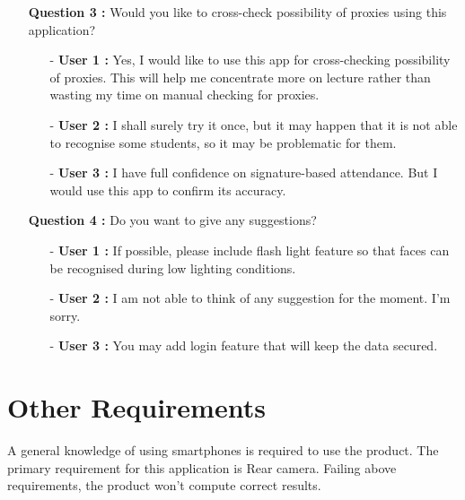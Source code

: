 \documentclass{scrreprt}
\begin{document}
\begin{enumerate}
\begin{enumerate}
\begin{enumerate}
\end{enumerate}
\item[] \textbf{Question 3 :} Would you like to cross-check possibility of proxies using this application? 
\begin{enumerate}
\item[-] \textbf{User 1 :} Yes, I would like to use this app for cross-checking possibility of proxies. This will help me concentrate more on lecture rather than wasting my time on manual checking for proxies.
\item[-] \textbf{User 2 :} I shall surely try it once, but it may happen that it is not able to recognise some students, so it may be problematic for them.
\item[-] \textbf{User 3 :} I have full confidence on signature-based attendance. But I would use this app to confirm its accuracy.
\end{enumerate}
\item[] \textbf{Question 4 :} Do you want to give any suggestions?
\begin{enumerate}
\item[-] \textbf{User 1 :} If possible, please include flash light feature so that faces can be recognised during low lighting conditions.
\item[-] \textbf{User 2 :} I am not able to think of any suggestion for the moment. I'm sorry.
\item[-] \textbf{User 3 :} You may add login feature that will keep the data secured.
\end{enumerate}
\end{enumerate}

\end{enumerate}

\chapter{Other Requirements}
A general knowledge of using smartphones is required to use the product.
The primary requirement for this application is Rear camera.
Failing above requirements, the product won’t compute correct results.
\end{document}
